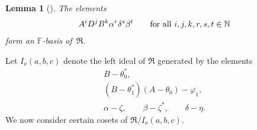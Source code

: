 \documentclass[pdftex]{sigma}
\def\N{\mathbb N}
\def\F{\mathbb F}
\numberwithin{equation}{section}
\newtheorem{Lemma}[Theorem]{Lemma}
\begin{document}
\begin{Lemma}[{\cite[Theorem 5.1]{SH:2017-1}}]\label{lem:basisURA}
The elements
\begin{gather*}
A^i D^j B^k \alpha^r \delta^s \beta^t\qquad \hbox{for all $i,j,k,r,s,t\in \N$}\label{eq:basisURA}
\end{gather*}
form an $\F$-basis of~$\Re$.
\end{Lemma}

Let $I_\nu(a,b,c)$ denote the left ideal of $\Re$ generated by the elements
\begin{gather}
B-\theta_0^*,\label{U1}\\
(B-\theta_1^*)(A-\theta_0)-\varphi_1,\label{U2}\\
\alpha-\zeta,\qquad\beta-\zeta^*,\qquad\delta-\eta.
\label{U3}
\end{gather}
We now consider certain cosets of $\Re/I_\nu(a,b,c)$.
\end{document}
